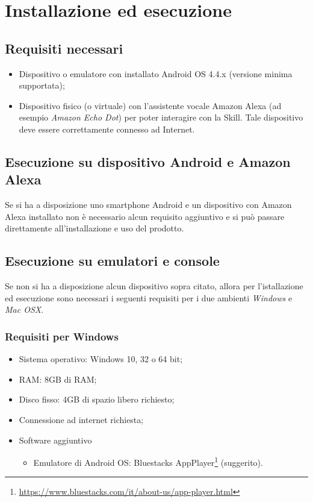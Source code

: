 \clearpage
\clearpage
\section{Installazione ed esecuzione}
\label{sec:installazione}
\subsection{Requisiti necessari}
\label{sec:requisiti_software}
\begin{itemize}
	\item Dispositivo o emulatore con installato Android OS 4.4.x (versione minima supportata);
	\item Dispositivo fisico (o virtuale) con l'assistente vocale Amazon Alexa (ad esempio \textit{Amazon Echo Dot}) per poter interagire con la Skill.
	Tale dispositivo deve essere correttamente connesso ad Internet.
\end{itemize}
\subsection{Esecuzione su dispositivo Android e Amazon Alexa}
Se si ha a disposizione uno smartphone Android e un dispositivo con Amazon Alexa installato non è necessario alcun requisito aggiuntivo e si può passare direttamente all'installazione e uso del prodotto.  
\subsection{Esecuzione su emulatori e console}
Se non si ha a disposizione alcun dispositivo sopra citato, allora per l'istallazione ed esecuzione sono necessari i seguenti requisiti per i due ambienti \textit{Windows} e \textit{Mac OSX}.
\subsubsection{Requisiti per Windows}
\label{sec:requisiti_win}
\begin{itemize}
	\item Sistema operativo: Windows 10, 32 o 64 bit;
	\item RAM: 8GB di RAM;
	\item Disco fisso: 4GB di spazio libero richiesto;
	\item Connessione ad internet richiesta;
	\item Software aggiuntivo
	\begin{itemize}
		\item Emulatore di Android OS: Bluestacks AppPlayer\footnote{\href{https://www.bluestacks.com/it/about-us/app-player.html}{https://www.bluestacks.com/it/about-us/app-player.html}} (suggerito).
	\end{itemize}
\end{itemize}
